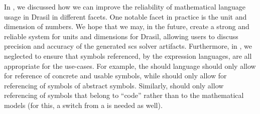 In , we discussed how we can improve the
reliability of mathematical language usage in Drasil in different facets. One
notable facet in practice is the unit and dimension of numbers. We hope that we
may, in the future, create a strong and reliable system for units and dimensions
for Drasil, allowing users to discuss precision and accuracy of the generated
\acs{scs} solver artifacts. Furthermore, in , we neglected
to ensure that symbols referenced, by the expression languages, are all
appropriate for the use-cases. For example, the \Expr{} should language should
only allow for reference of concrete and usable symbols, while \ModelExpr{}
should only allow for referencing of symbols of abstract symbols. Similarly,
\CodeExpr{} should only allow referencing of symbols that belong to ``code''
rather than to the mathematical models (for this, a switch from a
\QuantityDict{} is needed as well).

